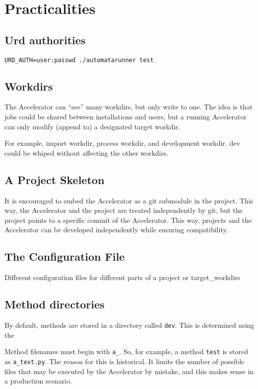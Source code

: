\documentclass[a4paper]{article}
\begin{document}
\section{Practicalities}

\subsection{Urd authorities}
\begin{verbatim}
URD_AUTH=user:passwd ./automatarunner test
\end{verbatim}

\subsection{Workdirs}
The Accelerator can ``see'' many workdirs, but only write to one.  The
idea is that jobs could be shared between installations and users, but
a running Accelerator can only modify (append to) a designated target
workdir.

For example, import workdir, process workdir, and development workdir.
dev could be whiped without affecting the other workdirs.


\subsection{A Project Skeleton}
It is encouraged to embed the Accelerator as a git submodule in the
project.  This way, the Accelerator and the project are treated
independently by git, but the project points to a specific commit of
the Accelerator.  This way, projects and the Accelerator can be
developed independently while ensuring compatibility.

\subsection{The Configuration File}

Different configuration files for different parts of a project or target\_workdirs


\subsection{Method directories}
By default, methods are stored in a directory called \texttt{dev}.
This is determined using the 

Method filenames must begin with \texttt{a\_}.  So, for example, a
method \texttt{test} is stored as \texttt{a\_text.py}.  The reason for
this is historical.  It limits the number of possible files that may
be executed by the Accelerator by mistake, and this makes sense in a
production scenario.
\end{document}

